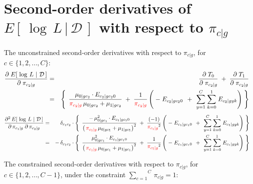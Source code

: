 

\section{Second-order derivatives of $E\!\left[\,\left.\log\,L\,\right\vert\,\mathcal{D}\,\right]$ with respect to $\pi_{c \vert g}$}
\setcounter{theorem}{0}
\setcounter{equation}{0}

\renewcommand{\theenumi}{\roman{enumi}}
\renewcommand{\labelenumi}{\textnormal{(\theenumi)}$\;\;$}

The unconstrained second-order derivatives with respect to $\pi_{c \vert g}$, for $c \in \{1,2,\ldots,C\}$:
\begin{eqnarray*}
\dfrac{\partial\;E\!\left[\,\left.\log\,L\;\right\vert\,\mathcal{D}\,\right]}{\partial\;\pi_{c_{2} \vert g}}
&=& \dfrac{\partial\;T_{0}}{\partial\;\pi_{c_{2} \vert g}} \;+\; \dfrac{\partial\;T_{1}}{\partial\;\pi_{c_{2} \vert g}}
\\
&=&
	\left\{\;\,
		\dfrac{\mu_{0 \vert gc_{2}}\cdot E_{c_{2} \vert gc_{2}0}}{{\color{red}\pi_{c_{2} \vert g}}\,\mu_{0 \vert gc_{2}} + \mu_{1\vert gc_{2}}}
		\;+\;
		\dfrac{1}{{\color{red}\pi_{c_{2} \vert g}}}
		\left(
			\;-\;E_{c_{2} \vert gc_{2}0}
			\,\;+\;\,
			\overset{C}{\underset{y=1}{\sum}} \; \overset{1}{\underset{k=0}{\sum}} \; E_{c_{2} \vert gyk}
		\right)
	\;\right\}
\end{eqnarray*}
\begin{eqnarray*}
\dfrac{\partial^{2}\,E\!\left[\,\left.\log\,L\;\right\vert\,\mathcal{D}\,\right]}{\partial\,\pi_{c_{1} \vert g}\;\partial\,\pi_{c_{2} \vert g}}
&=&
	\delta_{c_{1}c_{2}}
	\cdot
	\left\{\;\,
		\dfrac{
			-\,\mu_{0 \vert gc_{1}}^{2}\cdot E_{c_{1} \vert gc_{1}0}
			}{
			\left(\,{\color{red}\pi_{c_{1} \vert g}}\,\mu_{0 \vert gc_{1}} + \mu_{1\vert gc_{1}}\right)^{2}
			}
		\;+\;
		\dfrac{(-1)}{{\color{red}\pi_{c_{1} \vert g}}^{2}}
		\left(
			\;-\;E_{c_{1} \vert gc_{1}0}
			\,\;+\;\,
			\overset{C}{\underset{y=1}{\sum}} \; \overset{1}{\underset{k=0}{\sum}} \; E_{c_{1} \vert gyk}
		\right)
	\;\right\}
\\
&=&
	-\,\delta_{c_{1}c_{2}}
	\cdot
	\left\{\;\,
		\dfrac{
			\mu_{0 \vert gc_{1}}^{2}\cdot E_{c_{1} \vert gc_{1}0}
			}{
			\left(\,{\color{red}\pi_{c_{1} \vert g}}\,\mu_{0 \vert gc_{1}} + \mu_{1\vert gc_{1}}\right)^{2}
			}
		\;+\;
		\dfrac{1}{{\color{red}\pi_{c_{1} \vert g}}^{2}}
		\left(
			\;-\;E_{c_{1} \vert gc_{1}0}
			\,\;+\;\,
			\overset{C}{\underset{y=1}{\sum}} \; \overset{1}{\underset{k=0}{\sum}} \; E_{c_{1} \vert gyk}
		\right)
	\;\right\}
\end{eqnarray*}

\vskip 0.5cm
\noindent
The constrained second-order derivatives with respect to $\pi_{c \vert g}$, for $c \in \{1,2,\ldots,C-1\}$,
under the constraint $\overset{C}{\underset{c=1}{\sum}}\,\pi_{c \vert g} = 1$:

